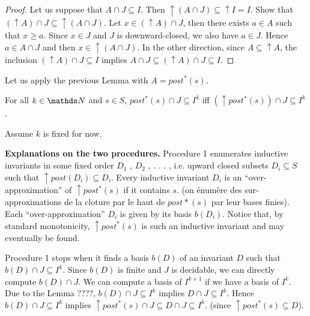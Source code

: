 \begin{proof}
Let us suppose that $A \cap J \subseteq I$. Then ${\uparrow (A \cap J)} \subseteq {\uparrow I} = I$.
Show that $({\uparrow A}) \cap J \subseteq {\uparrow (A \cap J)}$.
Let $x \in ({\uparrow A}) \cap J$, then there exists $a \in A$ such that $x \geq a$.
Since $x \in J$ and $J$ is downward-closed, we also have $a \in J$.
Hence $a \in A \cap J$ and then $x \in { \uparrow (A \cap J)}$.
In the other direction,
since $A \subseteq {\uparrow A}$, the inclusion
$({\uparrow  A}) \cap J \subseteq I$ implies
$A \cap J \subseteq ({\uparrow  A}) \cap J \subseteq I$.
\end{proof}

Let us apply the previous Lemma with $A=post^*(s)$.

\begin{corollary}
For all $k \in \N$ and $s \in S$,
$ post^*(s)\cap J \subseteq I^k $  iff $ (\uparrow  post^*(s)) \cap J \subseteq I^k$. 
\end{corollary}




Assume $k$ is fixed for now.

{\bf Explanations on the two procedures.}
Procedure 1 enumerates inductive invariants in some fixed order $D_1$ , $D_2$ , . . . , i.e. upward closed subsets $D_i \subseteq S$ such that $\uparrow post(D_i ) \subseteq D_i$. 
Every inductive invariant $D_i$ is an “over-approximation” of $\uparrow post^*(s)$ if it contains $s$.
(on énumère des sur-approximations de la cloture par le haut de $post*(s)$ par leur bases finies).
Each “over-approximation” $D_i$ is given by its basis $b(D_i)$. Notice that, by standard monotonicity, $\uparrow post^*(s)$ is such an inductive invariant and may
eventually be found.

Procedure 1 stops when it finds a basis $b(D)$ of an invariant $D$ such that
$b(D)  \cap J \subseteq I^k$.  Since $b(D)$ is finite and $J$ is decidable, we can
directly compute $b(D)  \cap J$.
We can compute a basis
of $I^{k+1}$ if we have a basis of $I^k$. %
Due to the Lemma ????, 
$b(D)  \cap J \subseteq I^k$ implies
$D  \cap J \subseteq I^k$.
Hence
$b(D)  \cap J \subseteq I^k$ implies
$\uparrow post^*(s) \cap J \subseteq D  \cap J \subseteq I^k$.
(since $ \uparrow post^*(s)  \subseteq D$).



